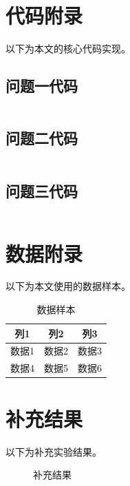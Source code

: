 
\appendix
\section{代码附录}

以下为本文的核心代码实现。

\subsection{问题一代码}

\begin{lstlisting}[language=Python, caption={问题一求解代码}]
% 在此粘贴问题一的代码
\end{lstlisting}

\subsection{问题二代码}

\begin{lstlisting}[language=Python, caption={问题二求解代码}]
% 在此粘贴问题二的代码
\end{lstlisting}

\subsection{问题三代码}

\begin{lstlisting}[language=Python, caption={问题三求解代码}]
% 在此粘贴问题三的代码
\end{lstlisting}

\section{数据附录}

以下为本文使用的数据样本。

\begin{table}[H]
\centering
\caption{数据样本}
\label{tab:data_sample}
\begin{tabular}{ccc}
\hline
列1 & 列2 & 列3 \\
\hline
数据1 & 数据2 & 数据3 \\
数据4 & 数据5 & 数据6 \\
\hline
\end{tabular}
\end{table}

\section{补充结果}

以下为补充实验结果。

\begin{figure}[H]
\centering
\caption{补充结果}
\label{fig:supplementary}
\end{figure}
